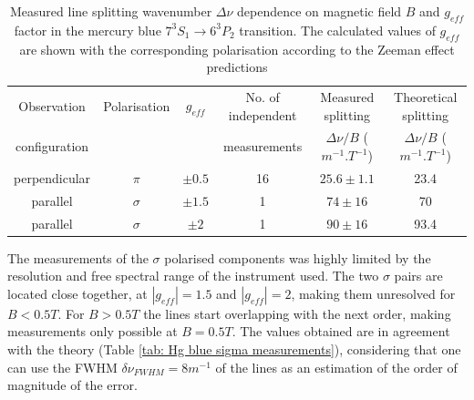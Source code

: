 \documentclass[11pt]{article}
\begin{document}
\begin{table}[h!]
    \centering
    \begin{tabular}{c|ccccc}
    \toprule
        Observation & Polarisation  & \( g_{eff} \) & No. of independent & Measured splitting  & Theoretical splitting \\
        configuration & & & measurements & $\Delta \nu / B$ ($\si{m^{-1}.T^{-1}}$) & $\Delta \nu / B$ ($\si{m^{-1}.T^{-1}}$) \\
    \midrule
        perpendicular & \( \pi \) & $\pm 0.5$ & 16 & $25.6 \pm 1.1 $ & 23.4\\
        parallel & \( \sigma \) & $\pm 1.5$ & 1 & $74 \pm 16 $ & 70\\
        parallel & \( \sigma \) & $\pm 2$ & 1 & $90 \pm 16 $ & 93.4\\
    \bottomrule
  \end{tabular}
    \captionsetup{justification=centering}
  \caption{Measured line splitting wavenumber $\Delta \nu$ dependence on magnetic field $B$ and $g_{eff}$ factor in the mercury blue $7^3 S_1\rightarrow 6^3 P_2$ transition. The calculated values of \(g_{eff}\) are shown with the corresponding polarisation according to the Zeeman effect predictions}
  \label{tab: Hg blue results}
\end{table}
The measurements of the $\sigma$ polarised components was highly limited by the resolution and free spectral range of the instrument used. The two $\sigma$ pairs are located close together, at $|g_{eff}| = 1.5$ and $|g_{eff}| = 2$, making them unresolved for $B < 0.5 \si{T}$. For $B > 0.5 \si{T}$ the lines start overlapping with the next order, making measurements only possible at $B = 0.5 \si{T}$. The values obtained are in agreement with the theory (Table \ref{tab: Hg blue sigma measurements}), considering that one can use the FWHM $\delta \nu_{FWHM} = 8 \si{m^{-1}}$ of the lines as an estimation of the order of magnitude of the error. 
\end{document}
